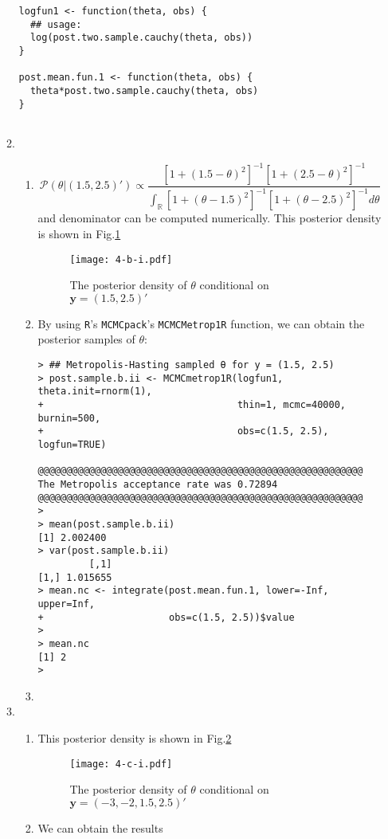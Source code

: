 \documentclass[twoside,12pt]{amsart}
\begin{document}
\begin{enumerate}
\begin{enumerate}
\begin{small}
\begin{verbatim}
logfun1 <- function(theta, obs) {
  ## usage:
  log(post.two.sample.cauchy(theta, obs))
}

post.mean.fun.1 <- function(theta, obs) {
  theta*post.two.sample.cauchy(theta, obs)
}
      
    \end{verbatim}
    \end{small}
  \item
    \begin{enumerate}
    \item
      \[ 
      \mathscr P\left(\theta|(1.5, 2.5)'\right) \propto \frac{[1 +
        (1.5 - \theta)^2]^{-1}[1 +
        (2.5 - \theta)^2]^{-1}}{\int_{\mathbb R}[1 +
        (\theta - 1.5)^2]^{-1}[1 +
        (\theta - 2.5)^2]^{-1}d\theta}
      \]
      and denominator can be computed numerically. This posterior
      density is shown in Fig.\ref{fig:4-b-i}

      \begin{figure}[h]
        \texttt{[image: 4-b-i.pdf]}
        \caption{The posterior density of $\theta$ conditional on $\bm
          y = (1.5, 2.5)'$}\label{fig:4-b-i}
      \end{figure}

    \item
      By using {\tt R}'s {\tt MCMCpack}'s {\tt MCMCMetrop1R} function,
      we can obtain the posterior samples of $\theta$:      
      \begin{verbatim}
> ## Metropolis-Hasting sampled θ for y = (1.5, 2.5)
> post.sample.b.ii <- MCMCmetrop1R(logfun1, theta.init=rnorm(1), 
+                                  thin=1, mcmc=40000, burnin=500, 
+                                  obs=c(1.5, 2.5), logfun=TRUE) 

@@@@@@@@@@@@@@@@@@@@@@@@@@@@@@@@@@@@@@@@@@@@@@@@@@@@@@@@@
The Metropolis acceptance rate was 0.72894
@@@@@@@@@@@@@@@@@@@@@@@@@@@@@@@@@@@@@@@@@@@@@@@@@@@@@@@@@
> 
> mean(post.sample.b.ii)
[1] 2.002400
> var(post.sample.b.ii)
         [,1]
[1,] 1.015655
> mean.nc <- integrate(post.mean.fun.1, lower=-Inf, upper=Inf, 
+                      obs=c(1.5, 2.5))$value
> 
> mean.nc
[1] 2
>         
      \end{verbatim}

      
    \item
    \end{enumerate}
  \item
    \begin{enumerate}
    \item This posterior density is shown in Fig.\ref{fig:4-c-i}
      \begin{figure}[h]
        \texttt{[image: 4-c-i.pdf]}
        \caption{The posterior density of $\theta$ conditional on $\bm
          y = (-3, -2, 1.5, 2.5)'$}\label{fig:4-c-i}
      \end{figure}
    \item
      We can obtain the results 


\end{enumerate}
\end{enumerate}
\end{enumerate}
\end{document}
